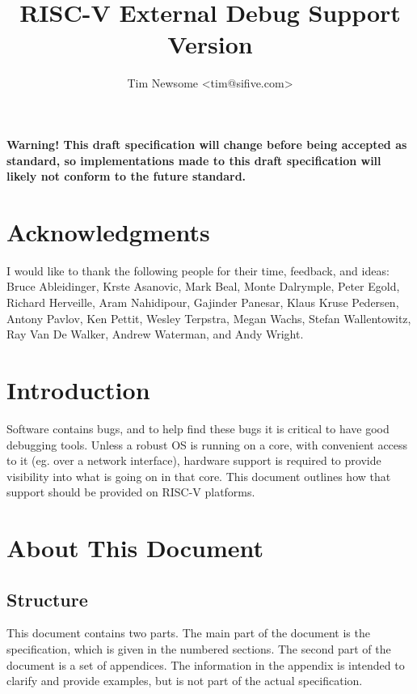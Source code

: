 \documentclass{article}
\title{RISC-V External Debug Support\\
Version \versionnum\\
\GITHash
}
\author{Tim Newsome \textless tim@sifive.com\textgreater}
\date{\GITAuthorDate}
\begin{document}
\maketitle

{\bf Warning! This draft specification will change before being accepted as
standard, so implementations made to this draft specification will likely not
conform to the future standard.}

\tableofcontents
\listoffigures
\listoftables

\newpage

\section*{Acknowledgments}

I would like to thank the following people for their time, feedback, and ideas:
Bruce Ableidinger,
Krste Asanovic,
Mark Beal,
Monte Dalrymple,
Peter Egold,
Richard Herveille,
Aram Nahidipour,
Gajinder Panesar,
Klaus Kruse Pedersen,
Antony Pavlov,
Ken Pettit,
Wesley Terpstra,
Megan Wachs,
Stefan Wallentowitz,
Ray Van De Walker,
Andrew Waterman,
and Andy Wright.

\section{Introduction}

Software contains bugs, and to help find these bugs it is critical to have good
debugging tools. Unless a robust OS is running on a core, with convenient
access to it (eg. over a network interface), hardware support is required to
provide visibility into what is going on in that core.  This document outlines
how that support should be provided on RISC-V platforms.

\section{About This Document}

\subsection{Structure}

This document contains two parts. The main part of the document is the
specification, which is given in the numbered sections. The second part
of the document is a set of  appendices. The information
in the appendix is intended to clarify and provide examples, but is
not part of the actual specification.
\end{document}
